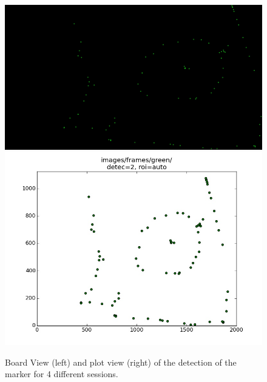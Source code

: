 \documentclass[a4paper,12pt]{article}
\begin{document}
\begin{itemize}
\begin{figure}[H]
\begin{center}
	\includegraphics[width=6 cm]{result6_board.jpg}
	\includegraphics[width=6 cm]{result6_plot.jpg}
	\caption{Board View (left) and plot view (right) of the detection of the marker for 4 different sessions.}
	\label{fig:res}
    \end{center}
\end{figure}
\end{itemize}
\end{document}
